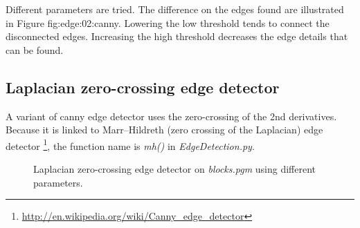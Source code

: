 \documentclass[paper=a4, fontsize=11pt]{scrartcl}
\numberwithin{equation}{section}		%
\numberwithin{figure}{section}			%
\begin{document}
Different parameters are tried. 
The difference on the edges found are illustrated in Figure {fig:edge:02:canny}.
Lowering the low threshold tends to connect the disconnected edges.
Increasing the high threshold decreases the edge details that can be found.

\subsection{Laplacian zero-crossing edge detector}

A variant of canny edge detector uses the zero-crossing of the 2nd derivatives.
Because it is linked to Marr–Hildreth (zero crossing of the Laplacian) edge detector \footnote{\url{http://en.wikipedia.org/wiki/Canny_edge_detector}}, the function name is \emph{mh()} in \emph{EdgeDetection.py}.

\begin{figure}[h]
\centering
{}
\caption{Laplacian zero-crossing edge detector on \emph{blocks.pgm} using different parameters.}
\label{fig:edge:02:mh}
\end{figure}
\end{document}

